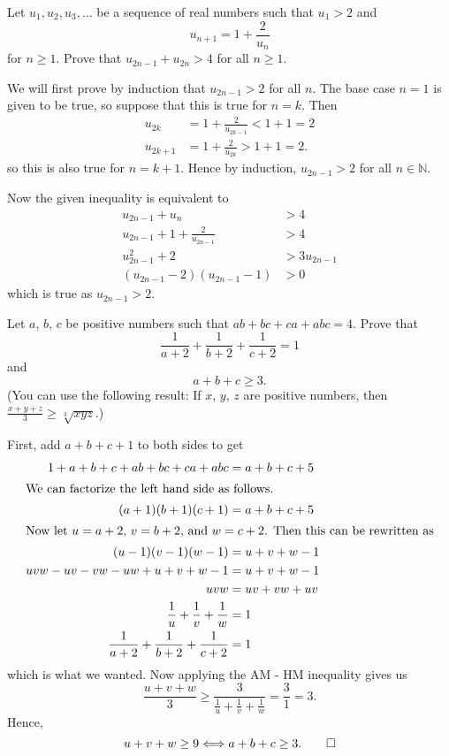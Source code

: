 \begin{question}
    Let $u_{1}, u_{2}, u_{3}, \ldots$ be a sequence of real numbers such that
    $u_{1} > 2$ and 
    \[u_{n + 1} = 1 + \frac{2}{u_{n}}\] 
    for $n \geq 1$. Prove that $u_{2n - 1} + u_{2n} > 4$ for all $n \geq 1$.
\end{question}
\begin{solution}
    We will first prove by induction that $u_{2n - 1} > 2$ for all $n$. The
    base case $n = 1$ is given to be true, so suppose that this is true for $n
    = k$. Then 
    \begin{align*}
        u_{2k} &= 1 + \frac{2}{u_{2k - 1}} < 1 + 1 = 2\\
        u_{2k + 1} &= 1 + \frac{2}{u_{2k}} > 1 + 1 = 2.
    \end{align*}
    so this is also true for $n = k + 1$. Hence by induction, $u_{2n - 1} > 2$
    for all $n \in \mathbb{N}$. 

    Now the given inequality is equivalent to
    \begin{align*}
        u_{2n - 1} + u_{n} &> 4\\
        u_{2n - 1} + 1 + \frac{2}{u_{2n - 1}} &> 4\\
        u_{2n - 1}^2 + 2 &> 3u_{2n - 1}\\
        (u_{2n - 1} - 2)(u_{2n - 1} - 1) &> 0
    \end{align*}
    which is true as $u_{2n - 1} > 2$.
\end{solution}

\begin{question}
    Let $a$, $b$, $c$ be positive numbers such that $ab + bc + ca + abc = 4$.
    Prove that 
    \[\frac{1}{a + 2} + \frac{1}{b + 2} + \frac{1}{c + 2} = 1\]
    and
    \[a + b + c \geq 3.\]
    (You can use the following result: If $x$, $y$, $z$ are positive numbers,
    then $\frac{x + y + z}{3} \geq \sqrt[3]{xyz}$.)
\end{question}
\begin{solution}
    First, add $a + b + c + 1$ to both sides to get
    \begin{align*}
        1 + a + b + c + ab + bc + ca + abc &= a + b + c + 5\\
        \intertext{We can factorize the left hand side as follows.}
        (a + 1)(b + 1)(c + 1) &= a + b + c + 5\\
        \intertext{Now let $u = a + 2$, $v = b + 2$, and $w = c + 2$. Then this
        can be rewritten as}
        (u - 1)(v - 1)(w - 1) &= u + v + w - 1\\
        uvw - uv - vw - uw + u + v + w - 1 &= u + v + w - 1\\
        uvw &= uv + vw + uv\\
        \frac{1}{u} + \frac{1}{v} + \frac{1}{w} &= 1\\
        \frac{1}{a + 2} + \frac{1}{b + 2} + \frac{1}{c + 2} &= 1
    \end{align*}
    which is what we wanted. Now applying the AM - HM inequality gives us
    \[\frac{u + v + w}{3} \geq \frac{3}{\frac{1}{u} + \frac{1}{v} + \frac{1}{w}} = \frac{3}{1} = 3.\] 
    Hence, 
    \[u + v + w \geq 9 \Longleftrightarrow a + b + c \geq 3. \qedhere\]
\end{solution}

